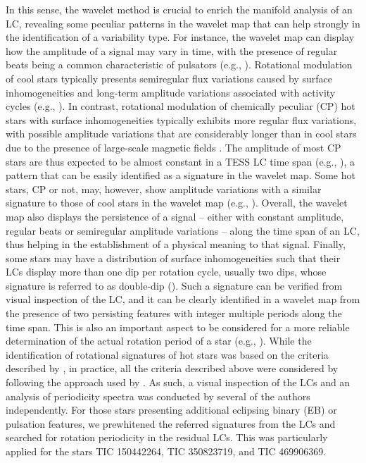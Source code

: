 \documentclass[RNAAS]{aastex63}
\begin{document}
In this sense, the wavelet method is crucial to enrich the manifold analysis of an LC, revealing some peculiar patterns in the wavelet map that can help strongly in the identification of a variability type. For instance, the wavelet map can display how the amplitude of a signal may vary in time, with the presence of regular beats being a common characteristic of pulsators (e.g., \citealp{Canto2020}). Rotational modulation of cool stars typically presents semiregular flux variations caused by surface inhomogeneities and long-term amplitude variations associated with activity cycles (e.g., \citealp{Canto2020,Ferreira2015}).
In contrast, rotational modulation of chemically peculiar (CP) hot stars with surface inhomogeneities typically exhibits more regular flux variations, with possible amplitude variations that are considerably longer than in cool stars due to the presence of large-scale magnetic fields \citep{Bowman2018}. The amplitude of most CP stars are thus expected to be almost constant in a TESS LC time span (e.g., \citealp{Bowman2018}), a pattern that can be easily identified as a signature in the wavelet map. Some hot stars, CP or not, may, however, show amplitude variations with a similar signature to those of cool stars in the wavelet map (e.g., \citealp{Drury2017}).
Overall, the wavelet map also displays the persistence of a signal -- either with constant amplitude, regular beats or semiregular amplitude variations -- along the time span of an LC, thus helping in the establishment of a physical meaning to that signal. Finally, some stars may have a distribution of surface inhomogeneities such that their LCs display more than one dip per rotation cycle, usually two dips, whose signature is referred to as double-dip (\citealp{Basri2018,Basri2018b}). Such a signature can be verified from visual inspection of the LC, and it can be clearly identified in a wavelet map from the presence of two persisting features with integer multiple periods along the time span. This is also an important aspect to be considered for a more reliable determination of the actual rotation period of a star (e.g., \citealp{Bowman2018,Canto2020}). While the identification of rotational signatures of hot stars was based on the criteria described by \citet{Bowman2018}, in practice, all the criteria described above were considered by following the approach used by \citet{Pedersen2019}. As such, a visual inspection of the LCs and an analysis of periodicity spectra was conducted by several of the authors independently. For those stars presenting additional eclipsing binary (EB) or pulsation features, we prewhitened the referred signatures from the LCs and searched for rotation periodicity in the residual LCs. This was particularly applied for the stars TIC 150442264, TIC 350823719, and TIC 469906369.
\end{document}
